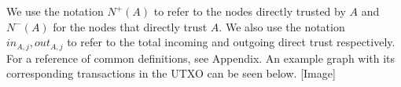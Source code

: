 \documentclass[11pt]{llncs}
\theoremstyle{definition}
\begin{document}
     We use the notation $N^{+}(A)$ to refer to the nodes directly trusted by $A$ and $N^{-}(A)$ for the nodes that directly
     trust $A$. We also use the notation $in_{A, j}, out_{A, j}$ to refer to the total incoming and outgoing direct trust
     respectively. For a reference of common definitions, see Appendix. An example graph with its corresponding transactions
     in the UTXO can be seen below. [Image]
\end{document}
